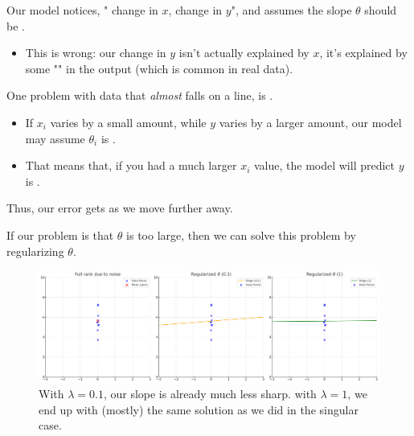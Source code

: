         Our model notices, " change in $x$,  change in $y$", and assumes the slope $\theta$ should be .

            \begin{itemize}
                \item This is wrong: our change in $y$ isn't actually explained by $x$, it's explained by some "" in the output (which is common in real data).\\
            \end{itemize}

        \begin{concept}
            One problem with data that \textit{almost} falls on a line, is .

            \begin{itemize}
                \item If $x_i$ varies by a small amount, while $y$ varies by a larger amount, our model may assume $\theta_i$ is .

                \item That means that, if you had a much larger $x_i$ value, the model will predict $y$ is .
            \end{itemize}

            Thus, our error gets  as we move further away.
        \end{concept}



        If our problem is that $\theta$ is too large, then we can solve this problem by regularizing $\theta$.

        \begin{figure}[H]
        \centering
            \includegraphics[width=150mm,scale=0.5]{images/regression_images/full_rank_noise_regularized.png}
            \caption*{With $\lambda=0.1$, our slope is already much less sharp. with $\lambda=1$, we end up with (mostly) the same solution as we did in the singular case.}
        \end{figure}

